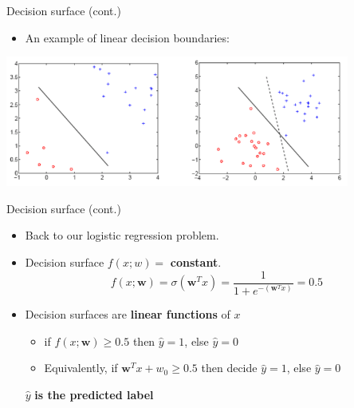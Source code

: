 \documentclass[serif, aspectratio=169]{beamer}
\begin{document}
\begin{frame}{Decision surface (cont.)}

    \begin{itemize}
        \item An example of linear decision boundaries:
    \end{itemize}
    \begin{center}
        \includegraphics[width=0.85\textwidth]{pic/DBoundary.png}
    \end{center}
\end{frame}

\begin{frame}{Decision surface (cont.)}
    \begin{itemize}
      \item Back to our logistic regression problem.
      \item Decision surface $f(x;w) = $ \textbf{constant}.
        \[
            f(x;\mathbf{w})=\sigma (\mathbf{w}^Tx) = \frac{1}{1 + e^{-(\mathbf{w}^Tx)}} = 0.5
        \]
      \item Decision surfaces are \textbf{linear functions} of $x$
        \begin{itemize}
            \item if $f(x;\mathbf{w}) \geq 0.5$ then $\hat{y}=1$, else $\hat{y} = 0$
            \item Equivalently, if $\mathbf{w}^Tx + w_0 \geq 0.5$ then decide $\hat{y}=1$, else $\hat{y}=0$
        \end{itemize}%
        \vfill
        \begin{center}
            \( \hat{y} \) \textbf{is the predicted label}
        \end{center}
    \end{itemize}
\end{frame}
\end{document}

